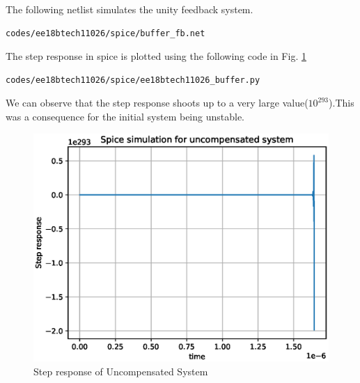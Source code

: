 \begin{enumerate}[label=\arabic*.,ref=\theenumi]
The following netlist simulates the unity feedback system. 
\begin{lstlisting}
codes/ee18btech11026/spice/buffer_fb.net
\end{lstlisting}
 The step response in spice is plotted using the following code in Fig. \ref{fig:ee18btech11026_buffer}
 \begin{lstlisting}
codes/ee18btech11026/spice/ee18btech11026_buffer.py
\end{lstlisting}

We can observe that the step response shoots up to a very large value($10^{293}$).This was a consequence for the initial system being unstable.
\renewcommand{\thefigure}{\theenumi.\arabic{figure}}
\begin{figure}[!h]
    \centering
    \includegraphics[width=\columnwidth]{./figs/ee18btech11026/ee18btech11026_spice_result_buffer.eps}
    \caption{Step response of Uncompensated System}
    \label{fig:ee18btech11026_buffer}
\end{figure}


\end{enumerate}
